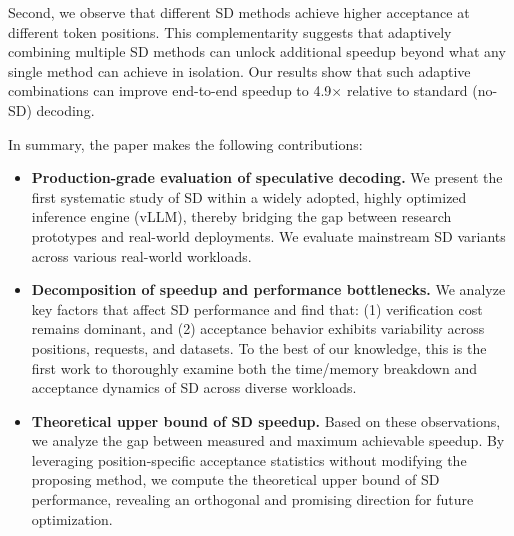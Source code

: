 \documentclass{article}
\begin{document}
Second, we observe that different SD methods achieve higher acceptance at different token positions. This complementarity suggests that adaptively combining multiple SD methods can unlock additional speedup beyond what any single method can achieve in isolation. Our results show that such adaptive combinations can improve end-to-end speedup to 4.9$\times$ relative to standard (no-SD) decoding.

In summary, the paper makes the following contributions:
\begin{itemize}[leftmargin=*, itemsep=2pt]
    \item \textbf{Production-grade evaluation of speculative decoding.} 
    We present the first systematic study of SD within a widely adopted, highly optimized inference engine (vLLM), thereby bridging the gap between research prototypes and real-world deployments. We evaluate mainstream SD variants across various real-world workloads.

    \item \textbf{Decomposition of speedup and performance bottlenecks.} 
    We analyze key factors that affect SD performance and find that: (1) verification cost remains dominant, and (2) acceptance behavior exhibits variability across positions, requests, and datasets. To the best of our knowledge, this is the first work to thoroughly examine both the time/memory breakdown and acceptance dynamics of SD across diverse workloads.

    \item \textbf{Theoretical upper bound of SD speedup.} 
    Based on these observations, we analyze the gap between measured and maximum achievable speedup. By leveraging position-specific acceptance statistics without modifying the proposing method, we compute the theoretical upper bound of SD performance, revealing an orthogonal and promising direction for future optimization.
\end{itemize}

















\end{document}

